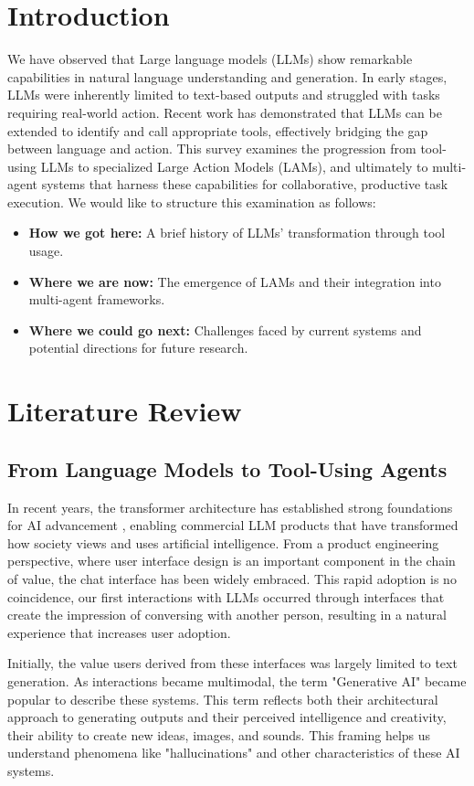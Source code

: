 \documentclass[journal,twoside,10pt]{IEEEtran}
\begin{document}
\section{Introduction}
We have observed that Large language models (LLMs) show remarkable capabilities in natural language understanding and generation. 
In early stages, LLMs were inherently limited to text-based outputs and struggled with tasks requiring real-world action. 
Recent work has demonstrated that LLMs can be extended to identify and call appropriate tools, effectively bridging the gap between language and action. 
This survey examines the progression from tool-using LLMs to specialized Large Action Models (LAMs), and ultimately to multi-agent systems that harness these capabilities for collaborative, productive task execution.
We would like to structure this examination as follows:
\begin{itemize}
    \item \textbf{How we got here:} A brief history of LLMs' transformation through tool usage.
    \item \textbf{Where we are now:} The emergence of LAMs and their integration into multi-agent frameworks.
    \item \textbf{Where we could go next:} Challenges faced by current systems and potential directions for future research.
\end{itemize}

\section{Literature Review}

\subsection{From Language Models to Tool-Using Agents}

In recent years, the transformer architecture has established strong foundations for AI advancement , enabling commercial LLM products that have transformed how society views and uses artificial intelligence. From a product engineering perspective, where user interface design is an important component in the chain of value, the chat interface has been widely embraced. This rapid adoption is no coincidence, our first interactions with LLMs occurred through interfaces that create the impression of conversing with another person, resulting in a natural experience that increases user adoption.

Initially, the value users derived from these interfaces was largely limited to text generation. As interactions became multimodal, the term "Generative AI" became popular to describe these systems. This term reflects both their architectural approach to generating outputs and their perceived intelligence and creativity, their ability to create new ideas, images, and sounds. This framing helps us understand phenomena like "hallucinations" and other characteristics of these AI systems.
\end{document}

